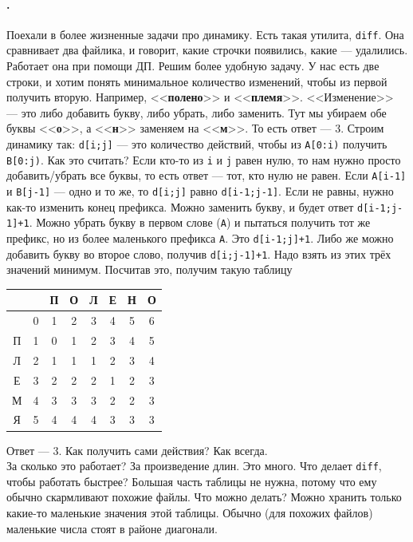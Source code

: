 \documentclass{article}
\newcommand{\pseudo}{PseudoLexer.py:PseudoLexer -x}
\newcommand{\pseudocode}[1]{\texttt{#1}}
\begin{document}
    \paragraph{.}
    Поехали в более жизненные задачи про динамику. Есть такая утилита, \texttt{diff}. Она сравнивает два файлика, и говорит, какие строчки появились, какие --- удалились. Работает она при помощи ДП. Решим более удобную задачу. У нас есть две строки, и хотим понять минимальное количество изменений, чтобы из первой получить вторую. Например, <<\textbf{полено}>> и <<\textbf{племя}>>. <<Изменение>> --- это либо добавить букву, либо убрать, либо заменить. Тут мы убираем обе буквы <<\textbf{о}>>, а <<\textbf{н}>> заменяем на <<\textbf{м}>>. То есть ответ --- 3. Строим динамику так: \pseudocode{d[i;j]} --- это количество действий, чтобы из \pseudocode{A[0:i)} получить \pseudocode{B[0:j)}. Как это считать? Если кто-то из \pseudocode{i} и \pseudocode{j} равен нулю, то нам нужно просто добавить/убрать все буквы, то есть ответ --- тот, кто нулю не равен. Если \pseudocode{A[i-1]} и \pseudocode{B[j-1]} --- одно и то же, то \pseudocode{d[i;j]} равно \pseudocode{d[i-1;j-1]}. Если не равны, нужно как-то изменить конец префикса. Можно заменить букву, и будет ответ \pseudocode{d[i-1;j-1]+1}. Можно убрать букву в первом слове (\pseudocode{A}) и пытаться получить тот же префикс, но из более маленького префикса \pseudocode{A}. Это \pseudocode{d[i-1;j]+1}. Либо же можно добавить букву во второе слово, получив \pseudocode{d[i;j-1]+1}. Надо взять из этих трёх значений минимум. Посчитав это, получим такую таблицу
    \begin{center}
        \begin{tabular}{c|ccccccc}
            \hline
            &&П&О&Л&Е&Н&О\\
            \hline
            &0&1&2&3&4&5&6\\
            П&1&0&1&2&3&4&5\\
            Л&2&1&1&1&2&3&4\\
            Е&3&2&2&2&1&2&3\\
            М&4&3&3&3&2&2&3\\
            Я&5&4&4&4&3&3&3\\
            \hline
        \end{tabular}
    \end{center}
    Ответ --- 3. Как получить сами действия? Как всегда.\\
    За сколько это работает? За произведение длин. Это много. Что делает \texttt{diff}, чтобы работать быстрее? Большая часть таблицы не нужна, потому что ему обычно скармливают похожие файлы. Что можно делать? Можно хранить только какие-то маленькие значения этой таблицы. Обычно (для похожих файлов) маленькие числа стоят в районе диагонали.
\end{document}
